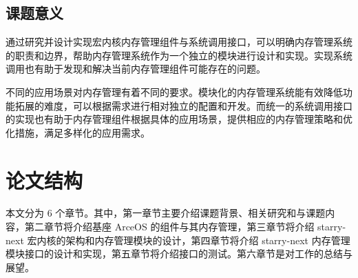 \subsection{课题意义}

通过研究并设计实现宏内核内存管理组件与系统调用接口，可以明确内存管理系统的职责和边界，帮助内存管理系统作为一个独立的模块进行设计和实现。实现系统调用也有助于发现和解决当前内存管理组件可能存在的问题。

不同的应用场景对内存管理有着不同的要求。模块化的内存管理系统能有效降低功能拓展的难度，可以根据需求进行相对独立的配置和开发。而统一的系统调用接口的实现也有助于内存管理组件根据具体的应用场景，提供相应的内存管理策略和优化措施，满足多样化的应用需求。

\section{论文结构}

本文分为 6 个章节。其中，第一章节主要介绍课题背景、相关研究和与课题内容，第二章节将介绍基座 ArceOS 的组件与其内存管理，第三章节将介绍 starry-next 宏内核的架构和内存管理模块的设计，第四章节将介绍 starry-next 内存管理模块接口的设计和实现，第五章节将介绍接口的测试。第六章节是对工作的总结与展望。